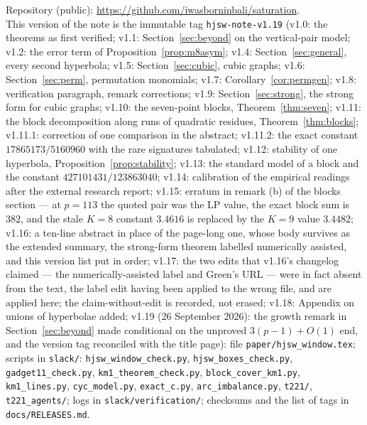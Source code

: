\documentclass[11pt]{article}
\theoremstyle{remark}
\begin{document}
{\sloppy Repository (public): \url{https://github.com/iwasborninbali/saturation}.\\
This version of the note is the immutable tag \texttt{hjsw-note-v1.19} (v1.0: the theorems as first verified; v1.1: Section~\ref{sec:beyond} on the vertical-pair model; v1.2: the error term of Proposition~\ref{prop:m8asym}; v1.4: Section~\ref{sec:general}, every second hyperbola; v1.5: Section~\ref{sec:cubic}, cubic graphs; v1.6: Section~\ref{sec:perm}, permutation monomials; v1.7: Corollary~\ref{cor:permgen}; v1.8: verification paragraph, remark corrections; v1.9: Section~\ref{sec:strong}, the strong form for cubic graphs; v1.10: the seven-point blocks, Theorem~\ref{thm:seven}; v1.11: the block decomposition along runs of quadratic residues, Theorem~\ref{thm:blocks}; v1.11.1: correction of one comparison in the abstract; v1.11.2: the exact constant $17865173/5160960$ with the rare signatures tabulated; v1.12: stability of one hyperbola, Proposition~\ref{prop:stability}; v1.13: the standard model of a block and the constant $427101431/123863040$; v1.14: calibration of the empirical readings after the external research report; v1.15: erratum in remark (b) of the blocks section --- at $p=113$ the quoted pair was the LP value, the exact block sum is $382$, and the stale $K=8$ constant $3.4616$ is replaced by the $K=9$ value $3.4482$; v1.16: a ten-line abstract in place of the page-long one, whose body survives as the extended summary, the strong-form theorem labelled numerically assisted, and this version list put in order; v1.17: the two edits that v1.16's changelog claimed --- the numerically-assisted label and Green's URL --- were in fact absent from the text, the label edit having been applied to the wrong file, and are applied here; the claim-without-edit is recorded, not erased; v1.18: Appendix on unions of hyperbolae added; v1.19 (26 September 2026): the growth remark in Section~\ref{sec:beyond} made conditional on the unproved $3(p-1)+O(1)$ end, and the version tag reconciled with the title page): file \texttt{paper/hjsw\_window.tex}; scripts in
\texttt{slack/}: \texttt{hjsw\_window\_check.py}, \texttt{hjsw\_boxes\_check.py}, \texttt{gadget11\_\allowbreak check.py},
\texttt{km1\_\allowbreak theorem\_\allowbreak check.py}, \texttt{block\_cover\_km1.py}, \texttt{km1\_lines.py}, \texttt{cyc\_model.py},
\texttt{exact\_c.py}, \texttt{arc\_imbalance.py}, \texttt{t221/}, \texttt{t221\_agents/}; logs in \texttt{slack/verification/};
checksums and the list of tags in \texttt{docs/RELEASES.md}.\par}
\end{document}
